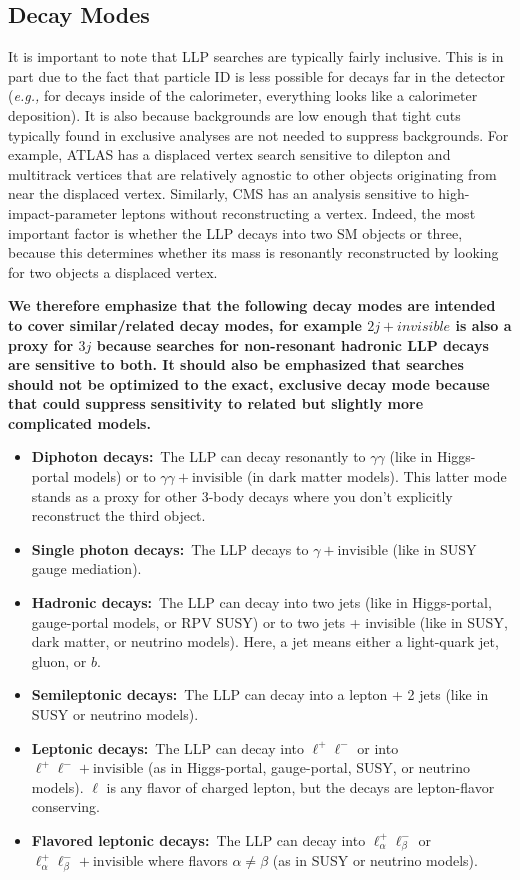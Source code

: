 \subsection{Decay Modes}
It is important to note that LLP searches are typically fairly inclusive. This is in part due to the fact that particle ID is less possible for decays far in the detector (\emph{e.g.,} for decays inside of the calorimeter, everything looks like a calorimeter deposition). It is also because backgrounds are low enough that tight cuts typically found in exclusive analyses are not needed to suppress backgrounds. For example, ATLAS has a displaced vertex search sensitive to dilepton and multitrack vertices that are relatively agnostic to other objects originating from near the displaced vertex. Similarly, CMS has an analysis sensitive to high-impact-parameter leptons without reconstructing a vertex. Indeed, the most important factor is whether the LLP decays into two SM objects or three, because this determines whether its mass is resonantly reconstructed by looking for two objects a displaced vertex. 

{\bf We therefore emphasize that the following decay modes are intended to cover similar/related decay modes, for example $2j+invisible$ is also a proxy for $3j$ because searches for non-resonant hadronic LLP decays are sensitive to both. It should also be emphasized that searches should not be optimized to the exact, exclusive decay mode because that could suppress sensitivity to related but slightly more complicated models.}

\begin{itemize}
\item {\bf Diphoton decays:}~The LLP can decay resonantly to $\gamma\gamma$ (like in Higgs-portal models) or to $\gamma\gamma+\mathrm{invisible}$ (in dark matter models). This latter mode stands as a proxy for other 3-body decays where you don't explicitly reconstruct the third object.
\item {\bf Single photon decays:}~The LLP decays to $\gamma+\mathrm{invisible}$ (like in SUSY gauge mediation).
\item {\bf Hadronic decays:}~The LLP can decay into two jets (like in Higgs-portal, gauge-portal models, or RPV SUSY) or to two jets + invisible (like in SUSY, dark matter, or neutrino models). Here, a jet means either a light-quark jet, gluon, or $b$.
\item {\bf Semileptonic decays:}~The LLP can decay into a lepton + 2 jets (like in SUSY or neutrino models).
\item {\bf Leptonic decays:}~The LLP can decay into $\ell^+\ell^-$ or into $\ell^+\ell^-+\mathrm{invisible}$ (as in Higgs-portal, gauge-portal, SUSY, or neutrino models). $\ell$ is any flavor of charged lepton, but the decays are lepton-flavor conserving.
\item {\bf Flavored leptonic decays:}~The LLP can decay into $\ell_\alpha^+\ell_\beta^-$ or $\ell_\alpha^+\ell_\beta^-+\mathrm{invisible}$ where flavors $\alpha\neq\beta$ (as in SUSY or neutrino models).
\end{itemize}

